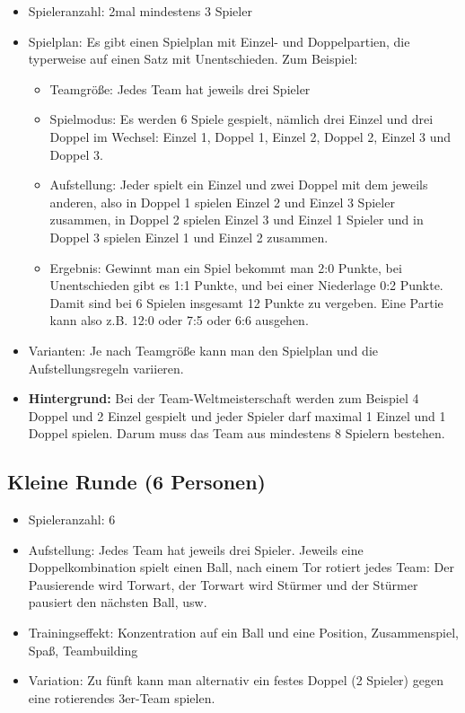 \begin{itemize}
\item Spieleranzahl: 2mal mindestens 3 Spieler
\item Spielplan: Es gibt einen Spielplan mit Einzel- und Doppelpartien, die typerweise auf einen Satz mit Unentschieden. Zum Beispiel:
\begin{itemize}
\item Teamgröße: Jedes Team hat jeweils drei Spieler
\item Spielmodus: Es werden 6 Spiele gespielt, nämlich drei Einzel und drei Doppel im Wechsel: Einzel 1, Doppel 1, Einzel 2, Doppel 2, Einzel 3 und Doppel 3.
\item Aufstellung: Jeder spielt ein Einzel und zwei Doppel mit dem jeweils anderen, also in Doppel 1 spielen Einzel 2 und Einzel 3 Spieler zusammen, in Doppel 2 spielen Einzel 3 und Einzel 1 Spieler und in Doppel 3 spielen Einzel 1 und Einzel 2 zusammen.  
\item Ergebnis: Gewinnt man ein Spiel bekommt man 2:0 Punkte, bei Unentschieden gibt es 1:1 Punkte, und bei einer Niederlage 0:2 Punkte. Damit sind bei 6 Spielen insgesamt 12 Punkte zu vergeben. Eine Partie kann also z.B. 12:0 oder 7:5 oder 6:6 ausgehen. 
\end{itemize}
\item Varianten: Je nach Teamgröße kann man den Spielplan und die Aufstellungsregeln variieren. 
\item {\normalfont \bfseries Hintergrund:} Bei der Team-Weltmeisterschaft werden zum Beispiel 4 Doppel und 2 Einzel gespielt und jeder Spieler darf maximal 1 Einzel und 1 Doppel spielen. Darum muss das Team aus mindestens 8 Spielern bestehen. 
\end{itemize}

\subsection{Kleine Runde (6 Personen)}
\label{spielformen:npersonen:kleine}

\begin{itemize}
\item Spieleranzahl: 6
\item Aufstellung: Jedes Team hat jeweils drei Spieler. Jeweils eine Doppelkombination spielt einen Ball, nach einem Tor rotiert jedes Team: Der Pausierende wird Torwart, der Torwart wird Stürmer und der Stürmer pausiert den nächsten Ball, usw.
\item Trainingseffekt: Konzentration auf ein Ball und eine Position, Zusammenspiel, Spaß, Teambuilding
\item Variation: Zu fünft kann man alternativ ein festes Doppel (2 Spieler) gegen eine rotierendes 3er-Team spielen.
\end{itemize}

